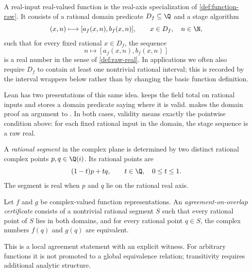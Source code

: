 \begin{definition}\label{def:real-fun-raw}
A real-input real-valued function is the real-axis specialization of
\cref{def:function-raw}.  It consists of a rational domain predicate
\(D_f\subseteq\Q\) and a stage algorithm
\[
  (x,n)\longmapsto [a_f(x,n),b_f(x,n)],
  \qquad x\in D_f,\quad n\in\N,
\]
such that for every fixed rational \(x\in D_f\), the sequence
\[
  n\longmapsto [a_f(x,n),b_f(x,n)]
\]
is a real number in the sense of \cref{def:raw-real}.  In applications we often
also require \(D_f\) to contain at least one nontrivial rational interval; this
is recorded by the interval wrappers below rather than by changing the basic
function definition.

Lean has two presentations of this same idea.   keeps the
 field total on rational inputs and stores a domain predicate
saying where it is valid.   makes the domain proof an
argument to .  In both cases, validity means exactly the
pointwise condition above: for each fixed rational input in the domain, the
stage sequence is a raw real.
\end{definition}

\begin{definition}\label{def:rational-segment}
A \emph{rational segment} in the complex plane is determined by two distinct
rational complex points \(p,q\in\Q(i)\).  Its rational points are
\[
  (1-t)p+tq,\qquad t\in\Q,\quad 0\le t\le 1.
\]
The segment is real when \(p\) and \(q\) lie on the rational real axis.
\end{definition}

\begin{definition}\label{def:function-agrees-on-overlap}
Let \(f\) and \(g\) be complex-valued function representations.  An
\emph{agreement-on-overlap certificate} consists of a nontrivial rational
segment \(S\) such that every rational point of \(S\) lies in both domains, and
for every rational point \(q\in S\), the complex numbers \(f(q)\) and \(g(q)\)
are equivalent.

This is a local agreement statement with an explicit witness.  For arbitrary
functions it is not promoted to a global equivalence relation; transitivity
requires additional analytic structure.
\end{definition}

